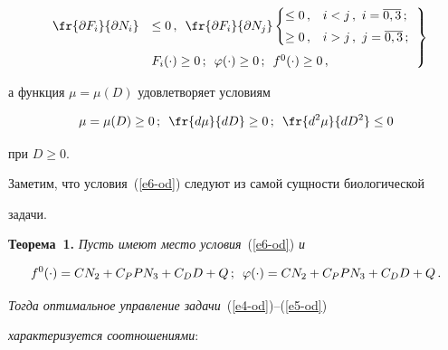 \begin{equation}


\left.


\begin{array}{rl}


\fr{\partial F_i}{\partial N_i}&\leq 0\,,\enskip \fr{\partial F_i}{\partial N_j} 


\begin{cases}


\leq 0\,, & i<j\,,\ i=\overline{0,3}\,;\\[3pt]


\geq 0\,, & i>j\,,\ j=\overline{0,3}\,;


\end{cases}\\[16pt]


&F_i(\cdot) \geq 0\,;\enskip \varphi(\cdot)\geq 0\,;\enskip f^0(\cdot)\geq 0\,,


\end{array}


\right\}


\label{e6-od}


\end{equation}


а функция $\mu=\mu(D)$ удовлетворяет условиям


$$


\mu=\mu(D)\geq 0\,;\enskip


\fr{d\mu}{dD}\geq 0\,; \enskip \fr{d^2\mu}{dD^2}\leq0


$$


при $D\geq 0$.


Заметим, что условия~(\ref{e6-od}) следуют из самой сущности биологической 


задачи.





\smallskip





\noindent


\textbf{Теорема~1.} \textit{Пусть имеют место условия}~(\ref{e6-od}) \textit{и}


$$


f^0(\cdot) =CN_2+C_P P N_3+C_D D+Q\,;\enskip


\varphi(\cdot) = CN_2+C_P P N_3+C_D D+Q\,.


$$


\textit{Тогда оптимальное управление задачи}~(\ref{e4-od})--(\ref{e5-od}) 


\textit{характеризуется соотношениями}: 


